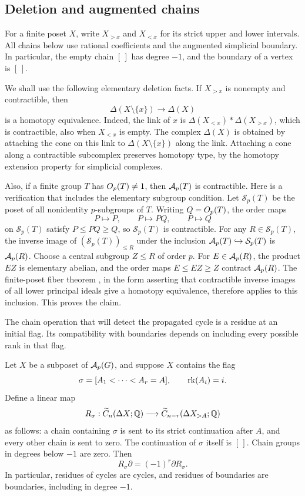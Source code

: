 \subsection{Deletion and augmented chains}

For a finite poset $X$, write $X_{>x}$ and $X_{<x}$ for its strict
upper and lower intervals.  All chains below use rational coefficients
and the augmented simplicial boundary.  In particular, the empty chain
$[\,]$ has degree $-1$, and the boundary of a vertex is $[\,]$.

We shall use the following elementary deletion facts.  If $X_{>x}$ is
nonempty and contractible, then
\[
 \Delta(X\setminus\{x\})\longrightarrow\Delta(X)
\]
is a homotopy equivalence.  Indeed, the link of $x$ is
$\Delta(X_{<x})*\Delta(X_{>x})$, which is contractible, also when
$X_{<x}$ is empty.  The complex $\Delta(X)$ is obtained by attaching
the cone on this link to $\Delta(X\setminus\{x\})$ along the link.
Attaching a cone along a contractible subcomplex preserves homotopy
type, by the homotopy extension property for simplicial complexes.

Also, if a finite group $T$ has $O_p(T)\ne1$, then $\mathcal A_p(T)$ is
contractible.  Here is a verification that includes the elementary
subgroup condition.  Let $\mathcal S_p(T)$ be the poset of all
nonidentity $p$-subgroups of $T$.  Writing $Q=O_p(T)$, the order maps
\[
 P\longmapsto P,\qquad P\longmapsto PQ,\qquad P\longmapsto Q
\]
on $\mathcal S_p(T)$ satisfy $P\le PQ\ge Q$, so
$\mathcal S_p(T)$ is contractible.  For any $R\in\mathcal S_p(T)$,
the inverse image of $(\mathcal S_p(T))_{\le R}$ under the inclusion
$\mathcal A_p(T)\hookrightarrow\mathcal S_p(T)$ is $\mathcal A_p(R)$.
Choose a central subgroup $Z\le R$ of order $p$.  For $E\in\mathcal A_p(R)$,
the product $EZ$ is elementary abelian, and the order maps
$E\le EZ\ge Z$ contract $\mathcal A_p(R)$.  The finite-poset fiber theorem
\cite{Quillen1978}, in the form asserting that contractible inverse
images of all lower principal ideals give a homotopy equivalence,
therefore applies to this inclusion.  This proves the claim.

The chain operation that will detect the propagated cycle is a residue
at an initial flag.  Its compatibility with boundaries depends on
including every possible rank in that flag.

\begin{lemma}\label{lem:saturated-residue}
Let $X$ be a subposet of $\mathcal A_p(G)$, and suppose $X$ contains the flag
\[
 \sigma=[A_1<\cdots<A_r=A],\qquad \operatorname{rk}(A_i)=i.
\]
Define a linear map
\[
 R_\sigma:\widetilde C_n(\Delta X;\mathbb Q)
       \longrightarrow
       \widetilde C_{n-r}(\Delta X_{>A};\mathbb Q)
\]
as follows: a chain containing $\sigma$ is sent to its strict
continuation after $A$, and every other chain is sent to zero.
The continuation of $\sigma$ itself is $[\,]$.  Chain groups in degrees
below $-1$ are zero.  Then
\begin{equation}\label{eq:residue-boundary}
 R_\sigma\partial=(-1)^r\partial R_\sigma.
\end{equation}
In particular, residues of cycles are cycles, and residues of boundaries
are boundaries, including in degree $-1$.
\end{lemma}

